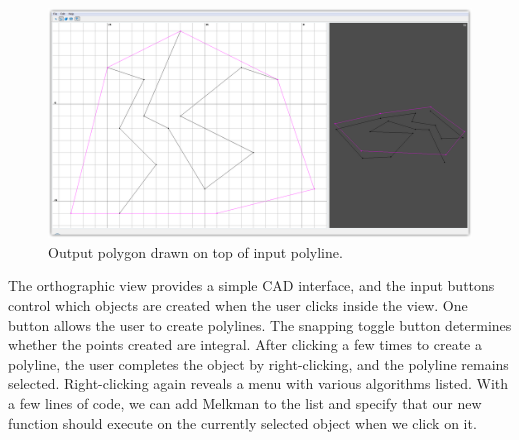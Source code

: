 \begin{figure}[H]
	\centering
	\includegraphics[width=\textwidth]{figures/melkman-output-1}
	\caption{Output polygon drawn on top of input polyline.} 
	\label{fig:melkman-output}
\end{figure}


The orthographic view provides a simple CAD interface, and the input buttons
control which objects are created when the user clicks inside the view. One
button allows the user to create polylines. The snapping toggle button
determines whether the points created are integral. After clicking a few times
to create a polyline, the user completes the object by right-clicking, and the
polyline remains selected. Right-clicking again reveals a menu with various
algorithms listed. With a few lines of code, we can add Melkman to the list and
specify that our new function should execute on the currently selected object
when we click on it.



 


 

